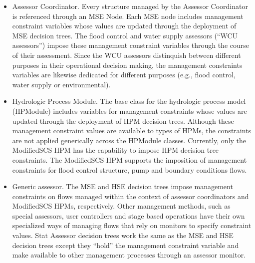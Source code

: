 \begin{itemize}
 \item Assessor Coordinator. Every structure managed by the Assessor
   Coordinator is referenced through an MSE Node. Each MSE node
   includes management constraint variables whose values are updated
   through the deployment of MSE decision trees. The flood control and
   water supply assessors (``WCU assessors'') impose these management
   constraint variables through the course of their assessment. Since
   the WCU assessors distinquish between different purposes in their
   operational decision making, the management constraints variables
   are likewise dedicated for different purposes (e.g., flood control,
   water supply or environmental).

 \item Hydrologic Process Module. The base class for the hydrologic
   process model (HPModule) includes variables for management
   constraints whose values are updated through the deployment of HPM
   decision trees. Although these management constraint values are
   available to types of HPMs, the constraints are not applied
   generically across the HPModule classes. Currently, only the
   ModifiedSCS HPM has the capability to impose HPM decision tree
   constraints. The ModifiedSCS HPM supports the imposition of
   management constraints for flood control structure, pump and
   boundary conditions flows.

 \item Generic assessor. The MSE and HSE decision trees impose
   management constraints on flows managed within the context of
   assessor coordinators and ModifiedSCS HPMs, respectively. Other
   management methods, such as special assessors, user controllers and
   stage based operations have their own specialized ways of managing
   flows that rely on monitors to specify constraint values. Stat
   Assessor decision trees work the same as the MSE and HSE decision
   trees except they ``hold'' the management constraint variable and
   make available to other management processes through an assessor
   monitor.
\end{itemize}

